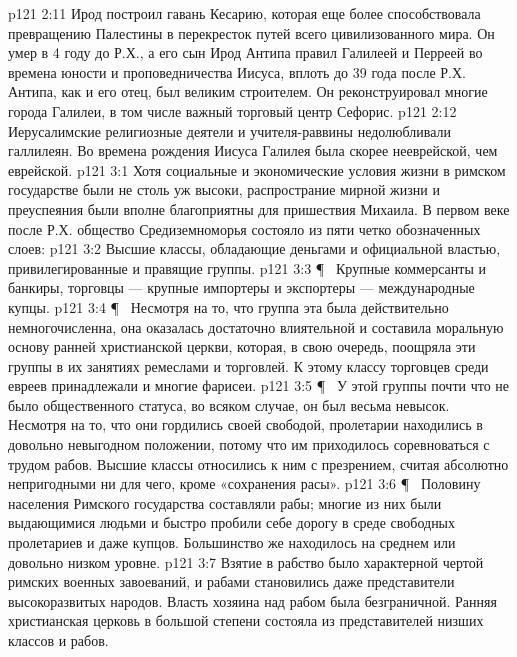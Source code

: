 \vs p121 2:11 Ирод построил гавань Кесарию, которая еще более способствовала превращению Палестины в перекресток путей всего цивилизованного мира. Он умер в 4 году до Р.Х., а его сын Ирод Антипа правил Галилеей и Перреей во времена юности и проповедничества Иисуса, вплоть до 39 года после Р.Х. Антипа, как и его отец, был великим строителем. Он реконструировал многие города Галилеи, в том числе важный торговый центр Сефорис.
\vs p121 2:12 Иерусалимские религиозные деятели и учителя\hyp{}раввины недолюбливали галлилеян. Во времена рождения Иисуса Галилея была скорее нееврейской, чем еврейской.
\vs p121 3:1 Хотя социальные и экономические условия жизни в римском государстве были не столь уж высоки, распространие мирной жизни и преуспеяния были вполне благоприятны для пришествия Михаила. В первом веке после Р.Х. общество Средиземноморья состояло из пяти четко обозначенных слоев:
\vs p121 3:2 \bibnobreakspace {} Высшие классы, обладающие деньгами и официальной властью, привилегированные и правящие группы.
\vs p121 3:3 \P\ \bibnobreakspace {} Крупные коммерсанты и банкиры, торговцы --- крупные импортеры и экспортеры --- международные купцы.
\vs p121 3:4 \P\ \bibnobreakspace {} Несмотря на то, что группа эта была действительно немногочисленна, она оказалась достаточно влиятельной и составила моральную основу ранней христианской церкви, которая, в свою очередь, поощряла эти группы в их занятиях ремеслами и торговлей. К этому классу торговцев среди евреев принадлежали и многие фарисеи.
\vs p121 3:5 \P\ \bibnobreakspace {} У этой группы почти что не было общественного статуса, во всяком случае, он был весьма невысок. Несмотря на то, что они гордились своей свободой, пролетарии находились в довольно невыгодном положении, потому что им приходилось соревноваться с трудом рабов. Высшие классы относились к ним с презрением, считая абсолютно непригодными ни для чего, кроме «сохранения расы».
\vs p121 3:6 \P\ \bibnobreakspace {} Половину населения Римского государства составляли рабы; многие из них были выдающимися людьми и быстро пробили себе дорогу в среде свободных пролетариев и даже купцов. Большинство же находилось на среднем или довольно низком уровне.
\vs p121 3:7 Взятие в рабство было характерной чертой римских военных завоеваний, и рабами становились даже представители высокоразвитых народов. Власть хозяина над рабом была безграничной. Ранняя христианская церковь в большой степени состояла из представителей низших классов и рабов.
